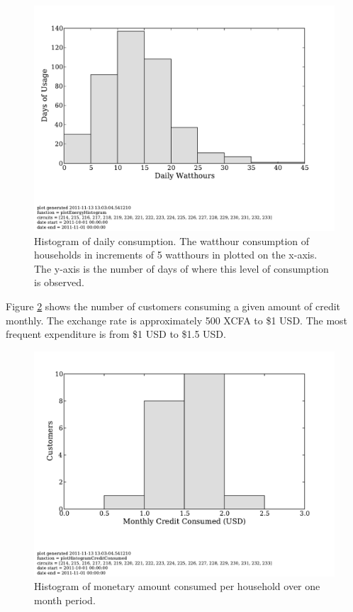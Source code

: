 \documentclass{sig-alternate}
\begin{document}
\begin{figure}[]
\begin{center}
\includegraphics[trim = 0in 1.3in 0in 0in, clip, width=\columnwidth]
                {figures/energyHistogram.pdf}
\end{center}
\caption{Histogram of daily consumption.  The watthour consumption of households
in increments of 5 watthours in plotted on the x-axis.  The y-axis is the number of
days of where this level of consumption is observed.}
\label{energyHistogram}
\end{figure}

Figure \ref{consumptionHistogram} shows the number of customers consuming
a given amount of credit monthly.  
The exchange rate is approximately 500 XCFA to \$1 USD.
The most frequent expenditure is from \$1 USD to \$1.5 USD.

\begin{figure}[]
\begin{center}
\includegraphics[trim = 0in 1.3in 0in 0in, clip, width=\columnwidth]
                {figures/consumptionHistogram.pdf}
\end{center}
\caption{Histogram of monetary amount consumed per household over one month period.}
\label{consumptionHistogram}
\end{figure}
\end{document}
